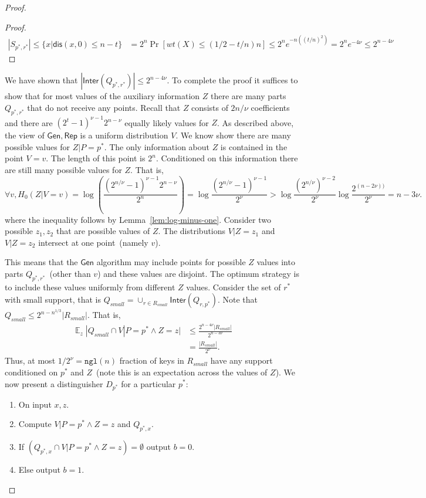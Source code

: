 \documentclass[11pt]{article}
\newcommand{\lemref}[1]{\mbox{Lemma~\ref{#1}}}
\DeclareMathOperator*{\expe}{\mathbb{E}}
\newcommand{\class}[1]{{\ensuremath{\mathsf{#1}}}}
\newcommand{\gen}{\ensuremath{\class{Gen}}\xspace}
\newcommand{\rep}{\ensuremath{\class{Rep}}\xspace}
\newcommand{\inter}{\ensuremath{\class{Inter}}\xspace}
\newcommand{\dis}{\ensuremath{\mathsf{dis}}}
\newcommand{\ngl}{\ensuremath{\mathtt{ngl}}\xspace}
\begin{document}
\begin{proof}
\begin{proof}
\begin{align*}
|S_{p^*, r^*}| \le \{ x | \dis (x, 0)\le n-t\} &= 2^n \Pr[ wt(X) \le (1/2-t/n)n] \le 2^n e^{-n ((t/n)^2)} = 2^n e^{-4\nu} \le 2^{n - 4\nu}
\end{align*}
\end{proof}

We have shown that $|\inter(Q_{p^*, r^*})| \le 2^{n-4\nu}$.  
To complete the proof it suffices to show that for most values of the auxiliary information $Z$ there are many parts $Q_{p^*, r^*}$ that do not receive any points.  
Recall that $Z$ consists of $2n/\nu$ coefficients and there are $(2^t-1)^{\nu-1} 2^{n-\nu}$ equally likely values for $Z$.
 As described above, the view of $\gen, \rep$ is a uniform distribution $V$.  We know show there are many possible values for $Z |P=p^*$.  The only information about $Z$ is contained in the point  $V=v$.  The length of this point is $2^n$.  Conditioned on this information there are still many possible values for $Z$.  That is, 
 \[
 \forall v, H_0(Z | V=v) =\log \left(\frac{(2^{n/\nu}-1)^{\nu-1} 2^{n-\nu}}{2^n} \right) = \log \frac{(2^{n/\nu}-1)^{\nu-1}}{2^{\nu}} >\log  \frac{(2^{n/\nu})^{\nu-2}}{2^{\nu}}  \log \frac{2^{(n-2\nu))}}{2^\nu} = n -3\nu.
 \]
 where the inequality follows by \lemref{lem:log-minus-one}.
Consider two possible $z_1, z_2$ that are possible values of $Z$.  The distributions $V| Z=z_1$ and $V | Z=z_2$ intersect at one point~(namely $v$).  

This means that the $\gen$ algorithm may include points for possible $Z$ values into parts $Q_{p^*, r^*}$~(other than $v$) and these values are disjoint.  The optimum strategy is to include these values uniformly from different $Z$ values.  Consider the set of $r^*$ with small support, that is $Q_{small} = \cup_{r\in R_{small}} \inter(Q_{r, p^*})$.  Note that $Q_{small} \le 2^{n-n^{1/3}}|R_{small}|$.
That is, 
\begin{align*}
\expe_z |Q_{small} \cap V | P=p^* \wedge Z=z | &\le \frac{2^{n-4\nu}|R_{small}|}{2^{n - 3\nu}}\\
&=\frac{|R_{small}|}{2^{\nu}}.
\end{align*}
Thus, at most $1/2^{\nu} = \ngl(n)$ fraction of keys in $R_{small}$ have any support  conditioned on $p^*$ and $Z$~(note this is an expectation across the values of $Z$).  We now present a distinguisher $D_{p^*}$ for a particular $p^*$:
\begin{enumerate}
\item On input $x, z$.
\item Compute $V|P=p^* \wedge Z=z$ and $Q_{p^*, x}$. 
\item If $(Q_{p^*, x} \cap V|P=p^* \wedge Z=z) =\emptyset$ output $b=0$.
\item Else output $b=1$.
\end{enumerate}


\end{proof}
\end{document}
